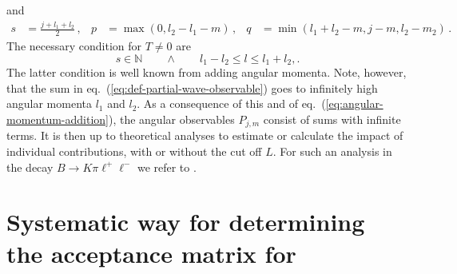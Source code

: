 \documentclass[aps,prd,reprint,nofootinbib,preprintnumbers]{revtex4}
\newcommand{\refeq}[1]{eq.~(\ref{eq:#1})}
\begin{document}
and
\begin{equation}
\begin{aligned}
    s & = \frac{j + l_1 + l_2}{2}\,, &
    p & = \max(0, l_2 - l_1 - m)\,, &
    q & = \min(l_1 + l_2 - m, j - m, l_2 - m_2)\,.
\end{aligned}
\end{equation}
The necessary condition for $T \neq 0$ are
\begin{equation}
    \label{eq:angular-momentum-addition}
    s \in \mathbb{N}\qquad \wedge \qquad l_1 - l_2 \leq l \leq l_1 + l_2,.
\end{equation}
The latter condition is well known from adding angular momenta. Note, however, that
the sum in \refeq{def-partial-wave-observable} goes to infinitely high angular momenta $l_1$ and $l_2$. As a consequence
of this and of \refeq{angular-momentum-addition}, the angular observables $P_{j,m}$
consist of sums with infinite terms. It is then up to theoretical analyses to
estimate or calculate the impact of individual contributions, with or without the cut off $L$.
For such an analysis in the decay $B\to K\pi\ell^+\ell^-$ we refer to \cite{Das:2014sra}.


\section{Systematic way for determining the acceptance matrix for }
\end{document}
